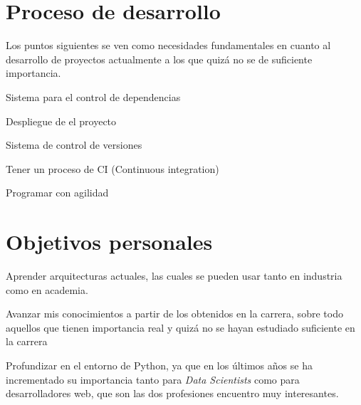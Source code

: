 \section{Proceso de desarrollo}
Los puntos siguientes se ven como necesidades fundamentales en cuanto al desarrollo de proyectos actualmente a los que quizá no se de suficiente importancia.
\begin{list}{-}{}
\item Sistema para el control de dependencias
\item Despliegue de el proyecto
\item Sistema de control de versiones
\item Tener un proceso de CI (Continuous integration) 
\item Programar con agilidad
\end{list}

\section{Objetivos personales}
\begin{list}{-}{}
\item Aprender arquitecturas actuales, las cuales se pueden usar tanto en industria como en academia.
\item Avanzar mis conocimientos a partir de los obtenidos en la carrera, sobre todo aquellos que tienen importancia real y quizá no se hayan estudiado suficiente en la carrera
\item Profundizar en el entorno de Python, ya que en los últimos años se ha incrementado su importancia tanto para \textit{Data Scientists} como para desarrolladores web, que son las dos profesiones encuentro muy interesantes.
\end{list}

